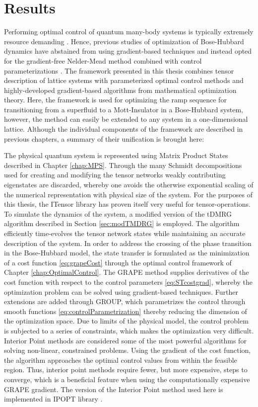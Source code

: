 \chapter{Results}

Performing optimal control of quantum many-body systems is typically extremely resource demanding \cite{Mennemann2015}. Hence, previous studies of optimization of Bose-Hubbard dynamics have abstained from using gradient-based techniques and instead opted for the gradient-free Nelder-Mead method combined with control parameterizations \cite{Doria2011,FrankBloch}. The framework presented in this thesis combines tensor description of lattice systems with parameterized optimal control methods and highly-developed gradient-based algorithms from mathematical optimization theory. Here, the framework is used for optimizing the ramp sequence for transitioning from a superfluid to a Mott-Insulator in a Bose-Hubbard system, however, the method can easily be extended to any system in a one-dimensional lattice.
Although the individual components of the framework are described in previous chapters, a summary of their unification is brought here:

The physical quantum system is represented using Matrix Product States described in Chapter \ref{chap:MPS}. Through the many Schmidt decompositions used for creating and modifying the tensor networks weakly contributing eigenstates are discarded, whereby one avoids the otherwise exponential scaling of the numerical representation with physical size of the system. For the purposes of this thesis, the ITensor library \cite{ITensor} has proven itself very useful for tensor-operations.
To simulate the dynamics of the system, a modified version of the tDMRG algorithm described in Section \ref{sec:modTMDRG} is employed. The algorithm efficiently time-evolves the tensor network states while maintaining an accurate description of the system.
In order to address the crossing of the phase transition in the Bose-Hubbard model, the state transfer is formulated as the minimization of a cost function \eqref{eq:grapeCost} through the optimal control framework of Chapter \ref{chap:OptimalControl}. The GRAPE method supplies derivatives of the cost function with respect to the control parameters \eqref{eq:STcostgrad}, whereby the optimization problem can be solved using gradient-based techniques. Further extensions are added through GROUP, which parametrizes the control through smooth functions \eqref{eq:controlParametrization} thereby reducing the dimension of the optimization space.
Due to limits of the physical model, the control problem is subjected to a series of constraints, which makes the optimization very difficult. 
Interior Point methods are considered some of the most powerful algorithms for solving non-linear, constrained problems. Using the gradient of the cost function, the algorithm approaches the optimal control values from within the feasible region. Thus, interior point methods require fewer, but more expensive, steps to converge, which is a beneficial feature when using the computationally expensive GRAPE gradient. The version of the Interior Point method used here is implemented in IPOPT library \cite{Wachter2006}.\\

